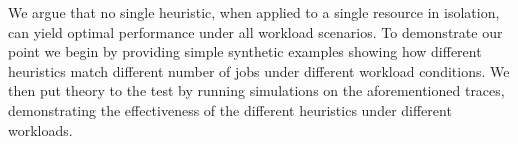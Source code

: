 We argue that no single heuristic, when applied to a single resource in
isolation, can yield optimal performance under all workload
scenarios.
To demonstrate our point we begin by providing simple synthetic examples
showing how different heuristics match different number of jobs under
different workload conditions.
We then put theory to the test by running simulations on the
aforementioned traces, demonstrating the effectiveness of the different heuristics 
under different workloads.



